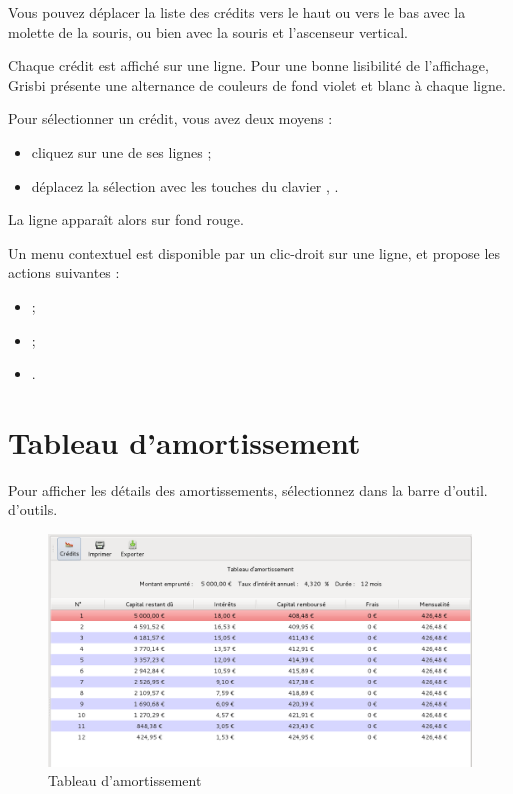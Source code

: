 Vous pouvez déplacer la liste des crédits vers le haut ou vers le bas avec la molette de la souris, ou bien avec la souris et l'ascenseur vertical. 


Chaque crédit est affiché sur une ligne. Pour une bonne lisibilité de l'affichage, Grisbi présente une alternance de couleurs de fond violet et blanc{\couleurs} à chaque ligne.

Pour sélectionner un crédit, vous avez deux moyens :
\begin{itemize}
	 \item cliquez sur une de ses lignes ;
	 \item déplacez la sélection avec les touches du clavier , .
\end{itemize}
La ligne apparaît alors sur fond rouge{\couleur}.

Un menu contextuel est disponible par un clic-droit sur une ligne, et propose les actions suivantes :
\begin{itemize}
	 \item {} ;
	 \item {} ;
	 \item {}.
\end{itemize}


\section{Tableau d'amortissement\label{credit-amortization}}


Pour afficher les détails des amortissements, sélectionnez  dans la barre 
\ifIllustration d'outil.
\else d'outils.
\fi

\ifIllustration
\begin{figure}[tbp]
\begin{center}
\includegraphics[scale=0.5]{image/screenshot/credit_amortization}
\end{center}
\caption{Tableau d'amortissement}
\label{credit-amortization-img}
\end{figure}
\fi


